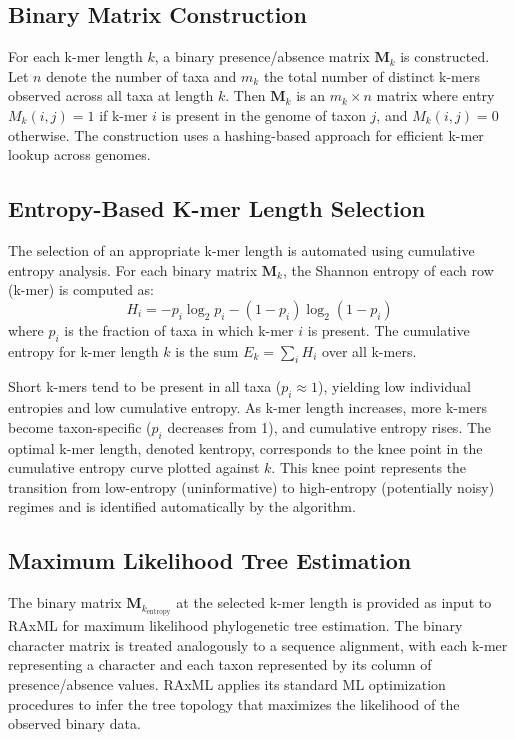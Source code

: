 \documentclass[12pt]{article}
\begin{document}
\subsection{Binary Matrix Construction}

For each k-mer length $k$, a binary presence/absence matrix $\mathbf{M}_k$ is constructed. Let $n$ denote the number of taxa and $m_k$ the total number of distinct k-mers observed across all taxa at length $k$. Then $\mathbf{M}_k$ is an $m_k \times n$ matrix where entry $M_{k}(i,j) = 1$ if k-mer $i$ is present in the genome of taxon $j$, and $M_{k}(i,j) = 0$ otherwise. The construction uses a hashing-based approach for efficient k-mer lookup across genomes.

\subsection{Entropy-Based K-mer Length Selection}

The selection of an appropriate k-mer length is automated using cumulative entropy analysis. For each binary matrix $\mathbf{M}_k$, the Shannon entropy of each row (k-mer) is computed as:
\begin{equation}
H_i = -p_i \log_2 p_i - (1-p_i) \log_2 (1-p_i)
\end{equation}
where $p_i$ is the fraction of taxa in which k-mer $i$ is present. The cumulative entropy for k-mer length $k$ is the sum $E_k = \sum_i H_i$ over all k-mers.

Short k-mers tend to be present in all taxa ($p_i \approx 1$), yielding low individual entropies and low cumulative entropy. As k-mer length increases, more k-mers become taxon-specific ($p_i$ decreases from 1), and cumulative entropy rises. The optimal k-mer length, denoted kentropy, corresponds to the knee point in the cumulative entropy curve plotted against $k$. This knee point represents the transition from low-entropy (uninformative) to high-entropy (potentially noisy) regimes and is identified automatically by the algorithm.

\subsection{Maximum Likelihood Tree Estimation}

The binary matrix $\mathbf{M}_{k_{\text{entropy}}}$ at the selected k-mer length is provided as input to RAxML \citep{stamatakis2014} for maximum likelihood phylogenetic tree estimation. The binary character matrix is treated analogously to a sequence alignment, with each k-mer representing a character and each taxon represented by its column of presence/absence values. RAxML applies its standard ML optimization procedures to infer the tree topology that maximizes the likelihood of the observed binary data.
\end{document}
